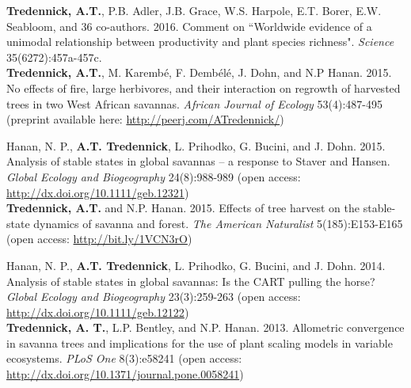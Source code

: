 \documentclass[margin,line]{resume}
\begin{document}
\begin{resume}
	\textbf{Tredennick, A.T.}, P.B. Adler, J.B. Grace, W.S. Harpole, E.T. Borer, E.W. Seabloom, and 36 co-authors. 2016. Comment on ``Worldwide evidence of a unimodal relationship between productivity and plant species richness". \textsl{Science} 35(6272):457a-457c. \vspace{-6mm}\\%
	
	\textbf{Tredennick, A.T.}, M. Karemb\'{e}, F. Demb\'{e}l\'{e}, J. Dohn, and N.P Hanan. 2015. No effects of fire, large herbivores, and their interaction on regrowth of harvested trees in two West African savannas. \textsl{African Journal of Ecology} 53(4):487-495 (preprint available here: \href{http://peerj.com/ATredennick/}{http://peerj.com/ATredennick/})

	Hanan, N. P., \textbf{A.T. Tredennick}, L. Prihodko, G. Bucini, and J. Dohn. 2015. Analysis of stable states in global savannas -- a response to Staver and Hansen. 	\textsl{Global Ecology and Biogeography} 24(8):988-989 (open access: \href{http://dx.doi.org/10.1111/geb.12321}{http://dx.doi.org/10.1111/geb.12321}) \vspace{-6mm}\\%
   
     	\textbf{Tredennick, A.T.} and N.P. Hanan. 2015. Effects of tree harvest on the stable-state dynamics of savanna and forest. \textsl{The American Naturalist} 5(185):E153-E165  
(open access: \href{http://www.jstor.org/stable/10.1086/680475}{http://bit.ly/1VCN3rO}) \vspace{-6mm} \\%

\newpage{}
	
	Hanan, N. P., \textbf{A.T. Tredennick}, L. Prihodko, G. Bucini, and J. Dohn. 2014. Analysis of stable states in global savannas: Is the CART pulling the horse? 	\textsl{Global Ecology and Biogeography} 23(3):259-263 (open access: \href{http://dx.doi.org/10.1111/geb.12122}{http://dx.doi.org/10.1111/geb.12122}) \vspace{-6mm}\\%
	
	\textbf{Tredennick, A. T.}, L.P. Bentley, and N.P. Hanan. 2013. Allometric convergence in savanna trees and implications for the use of plant scaling models in 	variable ecosystems. \textsl{PLoS One} 8(3):e58241 (open access: \href{http://dx.doi.org/10.1371/journal.pone.0058241}{http://dx.doi.org/10.1371/journal.pone.0058241})\vspace{-6mm}\\%


\end{resume}
\end{document}
